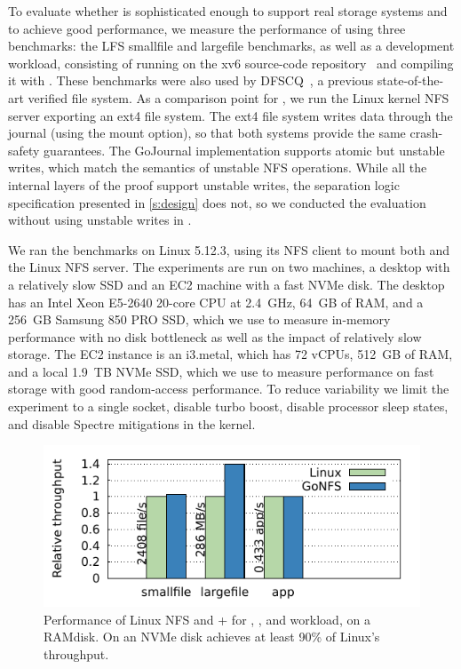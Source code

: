 To evaluate whether \txn is sophisticated enough to support real storage systems
and to achieve good performance, we measure the performance of \gnfs using three
benchmarks: the LFS smallfile and largefile benchmarks, as well as a development
workload, consisting of running  on the xv6 source-code
repository~\cite{xv6} and compiling it with . These benchmarks were
also used by DFSCQ~\cite{chen:dfscq}, a previous state-of-the-art verified
file system. As a comparison point for \gnfs, we run the Linux kernel NFS server
exporting an ext4 file system. The ext4 file system writes data through the
journal (using the  mount option), so that both systems provide
the same crash-safety guarantees. The GoJournal implementation supports atomic
but unstable writes, which match the semantics of unstable NFS 
operations. While all the internal layers of the proof support unstable writes,
the separation logic specification presented in \autoref{s:design} does not, so we conducted the
evaluation without using unstable writes in \gnfs.

We ran the benchmarks on Linux 5.12.3, using its NFS client to mount both \gnfs
and the Linux NFS server. The experiments are run on two machines, a desktop
with a relatively slow SSD and an EC2 machine with a fast NVMe disk. The
desktop has an Intel Xeon E5-2640 20-core CPU at 2.4~GHz, 64~GB of RAM,
and a 256~GB Samsung 850 PRO SSD, which we use to measure in-memory performance
with no disk bottleneck as well as the impact of relatively slow storage. The
EC2 instance is an i3.metal, which has 72 vCPUs, 512~GB of RAM, and a
local 1.9~TB NVMe SSD, which we use to measure performance on fast storage with
good random-access performance. To reduce variability we
limit the experiment to a single socket, disable turbo boost, disable processor
sleep states, and disable Spectre mitigations in the kernel.

\begin{figure}[ht!]
  \centering

  \includegraphics[scale=0.9]{fig/bench.pdf}

  \caption{Performance of Linux NFS and \txn + \gnfs for ,
    , and  workload, on a RAMdisk. On an NVMe disk \gnfs
    achieves at least 90\% of Linux's throughput.}
\label{fig:perf}
\end{figure}

